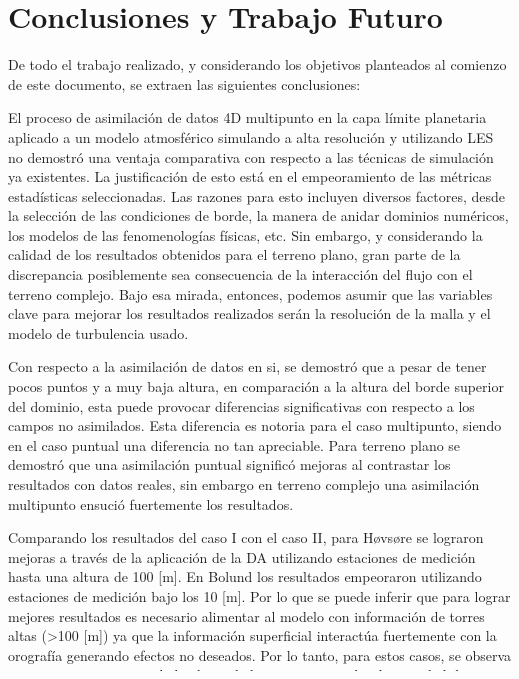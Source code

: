 \chapter{Conclusiones y Trabajo Futuro}
De todo el trabajo realizado, y considerando los objetivos planteados al comienzo de este documento, se extraen las siguientes conclusiones:

\begin{itemize*}
	\item El proceso de asimilación de datos 4D multipunto en la capa límite planetaria aplicado a un modelo atmosférico simulando a alta resolución y utilizando LES no demostró una ventaja comparativa con respecto a las técnicas de simulación ya existentes. La justificación de esto está en el empeoramiento de las métricas estadísticas seleccionadas. Las razones para esto incluyen diversos factores, desde la selección de las condiciones de borde, la manera de anidar dominios numéricos, los modelos de las fenomenologías físicas, etc. Sin embargo, y considerando la calidad de los resultados obtenidos para el terreno plano, gran parte de la discrepancia posiblemente sea consecuencia de la interacción del flujo con el terreno complejo. Bajo esa mirada, entonces, podemos asumir que las variables clave para mejorar los resultados realizados serán la resolución de la malla y el modelo de turbulencia usado.
	
	
	\item Con respecto a la asimilación de datos en si, se demostró que a pesar de tener pocos puntos y a muy baja altura, en comparación a la altura del borde superior del dominio, esta puede provocar diferencias significativas con respecto a los campos no asimilados. Esta diferencia es notoria para el caso multipunto, siendo en el caso puntual una diferencia no tan apreciable. Para terreno plano se demostró que una asimilación puntual significó mejoras al contrastar los resultados con datos reales, sin embargo en terreno complejo una asimilación multipunto ensució fuertemente los resultados.
	
	\item Comparando los resultados del caso I con el caso II, para Høvsøre se lograron mejoras a través de la aplicación de la DA utilizando estaciones de medición hasta una altura de 100 [m]. En Bolund los resultados empeoraron utilizando estaciones de medición bajo los 10 [m]. Por lo que se puede inferir que para lograr mejores resultados es necesario alimentar al modelo con información de torres altas (>100 [m]) ya que la información superficial interactúa fuertemente con la orografía generando efectos no deseados. Por lo tanto, para estos casos, se observa una mayor importancia de la altura de los puntos por sobre la cantidad de estos en la dirección horizontal, sin embargo debe existir algún tipo de combinación óptima entre las distribuciones horizontales-verticales de puntos.
	

\end{itemize*}

